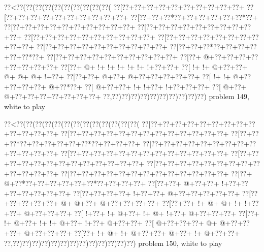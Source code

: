 \vbox{\vbox{\goo
\0??<\0??(\0??(\0??(\0??(\0??(\0??(\0??(\0??(\0??(\0??(
\0??[\0??+\0??+\0??+\0??+\0??+\0??+\0??+\0??+\0??+\0??+
\0??[\0??+\0??+\0??+\0??+\0??+\0??+\0??+\0??+\0??+\0??+
\0??[\0??+\0??+\0??*\0??+\0??+\0??+\0??+\0??+\0??*\0??+
\0??[\0??+\0??+\0??+\0??+\0??+\0??+\0??+\0??+\0??+\0??+
\0??[\0??+\0??+\0??+\0??+\0??+\0??+\0??+\0??+\0??+\0??+
\0??[\0??+\0??+\0??+\0??+\0??+\0??+\0??+\0??+\0??+\0??+
\0??[\0??+\0??+\0??+\0??+\0??+\0??+\0??+\0??+\0??+\0??+
\0??[\0??+\0??+\0??+\0??+\0??+\0??+\0??+\0??+\0??+\0??+
\0??[\0??+\0??+\0??*\0??+\0??+\0??+\0??+\0??+\0??*\0??+
\0??[\0??+\0??+\0??+\0??+\0??+\0??+\0??+\0??+\0??+\0??+
\0??[\0??+\- @+\0??+\0??+\0??+\0??+\0??+\0??+\0??+\0??+
\0??[\0??+\- @+\- !+\- !+\- !+\- !+\- !+\- !+\0??+\0??+
\0??[\- !+\- !+\- @+\0??+\0??+\- @+\- @+\- @+\- !+\0??+
\0??[\0??+\0??+\- @+\0??+\- @+\0??+\0??+\0??+\0??+\0??+
\0??[\- !+\- !+\- @+\0??+\0??+\0??+\0??+\- @+\0??*\0??+
\0??[\- @+\0??+\0??+\- !+\- !+\0??+\- !+\0??+\0??+\0??+
\0??[\- @+\0??+\- @+\0??+\0??+\0??+\0??+\0??+\0??+\0??+
\0??,\0??)\0??)\0??)\0??)\0??)\0??)\0??)\0??)\0??)\0??)
}
\hfil problem 149, white to play\hfil\break
}

\vbox{\vbox{\goo
\0??<\0??(\0??(\0??(\0??(\0??(\0??(\0??(\0??(\0??(\0??(\0??(\0??(\0??(
\0??[\0??+\0??+\0??+\0??+\0??+\0??+\0??+\0??+\0??+\0??+\0??+\0??+\0??+
\0??[\0??+\0??+\0??+\0??+\0??+\0??+\0??+\0??+\0??+\0??+\0??+\0??+\0??+
\0??[\0??+\0??+\0??*\0??+\0??+\0??+\0??+\0??+\0??*\0??+\0??+\0??+\0??+
\0??[\0??+\0??+\0??+\0??+\0??+\0??+\0??+\0??+\0??+\0??+\0??+\0??+\0??+
\0??[\0??+\0??+\0??+\0??+\0??+\0??+\0??+\0??+\0??+\0??+\0??+\0??+\0??+
\0??[\0??+\0??+\0??+\0??+\0??+\0??+\0??+\0??+\0??+\0??+\0??+\0??+\0??+
\0??[\0??+\0??+\0??+\0??+\0??+\0??+\0??+\0??+\0??+\0??+\0??+\0??+\0??+
\0??[\0??+\0??+\0??+\0??+\0??+\0??+\0??+\0??+\0??+\0??+\0??+\0??+\0??+
\0??[\0??+\- @+\0??*\0??+\0??+\0??+\0??+\0??+\0??*\0??+\0??+\0??+\0??+
\0??[\0??+\0??+\- @+\0??+\0??+\- !+\0??+\0??+\0??+\0??+\0??+\0??+\0??+
\0??[\0??+\0??+\0??+\0??+\- !+\0??+\0??+\- @+\0??+\0??+\0??+\0??+\0??+
\0??[\0??+\0??+\0??+\0??+\0??+\- @+\- @+\0??+\- @+\0??+\0??+\0??+\0??+
\0??[\0??+\0??+\- !+\- @+\- @+\- !+\- !+\0??+\0??+\- @+\0??+\0??+\0??+
\0??[\- !+\0??+\- !+\- @+\0??+\- !+\- @+\- !+\0??+\- @+\0??+\0??+\0??+
\0??[\0??+\- !+\- @+\0??+\- !+\- !+\- @+\0??+\- !+\0??+\- @+\0??+\0??+
\0??[\- @+\0??+\0??+\0??+\- @+\- @+\0??+\0??+\0??+\- @+\0??+\0??+\0??+
\0??[\0??+\- !+\- @+\- !+\- @+\0??+\0??+\- @+\0??+\- !+\- @+\0??+\0??+
\0??,\0??)\0??)\0??)\0??)\0??)\0??)\0??)\0??)\0??)\0??)\0??)\0??)\0??)
}
\hfil problem 150, white to play\hfil\break
}

